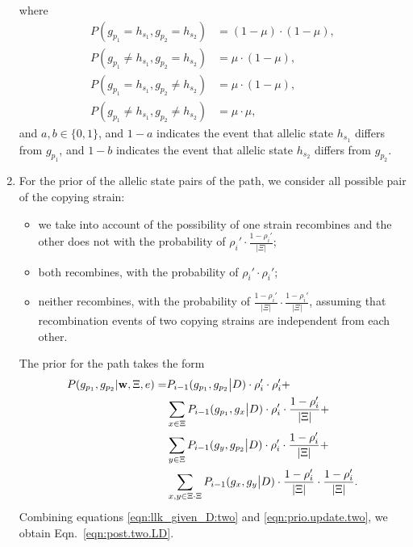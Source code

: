 \documentclass{bioinfo}
\begin{document}
\begin{enumerate}
\begin{equation}
\end{equation}
where
\begin{align*}
P(g_{p_1} = h_{s_1}, g_{p_2} = h_{s_2})       & = (1-\mu)\cdot(1-\mu) , \\
P(g_{p_1} \neq h_{s_1}, g_{p_2} = h_{s_2})    & = \mu\cdot(1-\mu),\\
P(g_{p_1} = h_{s_1}, g_{p_2} \neq h_{s_2})    & = \mu\cdot(1-\mu),\\
P(g_{p_1} \neq h_{s_1}, g_{p_2} \neq h_{s_2}) & = \mu \cdot \mu,
\end{align*}
and $a,b \in \{0, 1\}$, and $1-a$ indicates the event that allelic state $h_{s_1}$ differs from $g_{p_1}$, and $1-b$ indicates the event that allelic state $h_{s_2}$ differs from $g_{p_2}$.

\item
For the prior of the allelic state pairs of the path, we consider all possible pair of the copying strain:
\begin{itemize}
\item we take into account of the possibility of one strain recombines and the other does not with the probability of $\rho_i' \cdot \frac{1-\rho_i'}{|\Xi|}$;
\item both recombines, with the probability of $\rho_i' \cdot \rho_i'$;
\item neither recombines, with the probability of $\frac{1-\rho_i'}{|\Xi|} \cdot\frac{1-\rho_i'}{|\Xi|}$, assuming that recombination events of two copying strains are independent from each other.
\end{itemize}
The prior for the path takes the form
\begin{equation}
\begin{split}
P(g_{p_1}, g_{p_2}|\mathbf{w}, \Xi, e) = &  P_{i-1}(g_{p_1},g_{p_2}\big{|}D) \cdot \rho_i' \cdot \rho_i' + \\
                                         & \sum_{x\in \Xi} P_{i-1}(g_{p_1},g_{x}\big{|}D) \cdot \rho_i' \cdot \frac{1-\rho_i'}{|\Xi|} + \\
                                         & \sum_{y\in \Xi} P_{i-1}(g_{y},g_{p_2}\big{|}D) \cdot \rho_i' \cdot\frac{1-\rho_i'}{|\Xi|}+ \\
                                         & \sum_{x,y\in \Xi\cdot \Xi} P_{i-1}(g_{x},g_{y}\big{|}D)  \cdot\frac{1-\rho_i'}{|\Xi|} \cdot\frac{1-\rho_i'}{|\Xi|}. \label{eqn:prio.update.two}
\end{split}
\end{equation}
Combining equations \eqref{eqn:llk_given_D:two} and \eqref{eqn:prio.update.two}, we obtain Eqn.~\eqref{eqn:post.two.LD}.


\end{enumerate}
\end{document}
